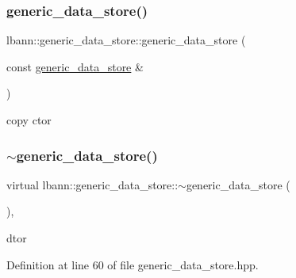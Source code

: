 \subsubsection{\texorpdfstring{generic\+\_\+data\+\_\+store()}{generic\_data\_store()}\hspace{0.1cm}{\footnotesize\ttfamily [2/2]}}
{\footnotesize\ttfamily lbann\+::generic\+\_\+data\+\_\+store\+::generic\+\_\+data\+\_\+store (\begin{DoxyParamCaption}\item[{const \hyperlink{classlbann_1_1generic__data__store}{generic\+\_\+data\+\_\+store} \&}]{ }\end{DoxyParamCaption})\hspace{0.3cm}{\ttfamily [default]}}



copy ctor 

\mbox{\label{classlbann_1_1generic__data__store_ac8f202a6aa5a3c5007a9d7d53c687851}} 
\subsubsection{\texorpdfstring{$\sim$generic\+\_\+data\+\_\+store()}{~generic\_data\_store()}}
{\footnotesize\ttfamily virtual lbann\+::generic\+\_\+data\+\_\+store\+::$\sim$generic\+\_\+data\+\_\+store (\begin{DoxyParamCaption}{ }\end{DoxyParamCaption})\hspace{0.3cm}{\ttfamily [inline]}, {\ttfamily [virtual]}}



dtor 



Definition at line 60 of file generic\+\_\+data\+\_\+store.\+hpp.


